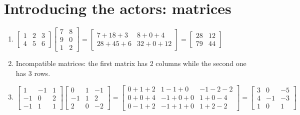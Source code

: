 \section*{Introducing the actors: matrices}

\begin{exercise}{2}
  \begin{enumerate}
    \item $\begin{bmatrix}1 & 2 & 3 \\ 4 & 5 & 6\end{bmatrix}
           \begin{bmatrix}7 & 8 \\ 9 & 0 \\ 1 & 2\end{bmatrix} =
           \begin{bmatrix}
              7 + 18 + 3 &  8 + 0 +  4 \\
             28 + 45 + 6 & 32 + 0 + 12
           \end{bmatrix} =
           \begin{bmatrix}28 & 12 \\ 79 & 44\end{bmatrix}$

    \item Incompatible matrices: the first matrix has 2 columns while the second
          one has 3 rows.

    \item $\begin{bmatrix}
              1 & -1 &  1 \\
             -1 &  0 &  2 \\
             -1 &  1 &  1
           \end{bmatrix}
           \begin{bmatrix}
              0 &  1 & -1 \\
             -1 &  1 &  2 \\
              2 &  0 & -2
           \end{bmatrix} =
           \begin{bmatrix}
             0 + 1 + 2 &  1 - 1 + 0 & -1 - 2 - 2 \\
             0 + 0 + 4 & -1 + 0 + 0 &  1 + 0 - 4 \\
             0 - 1 + 2 & -1 + 1 + 0 &  1 + 2 - 2
           \end{bmatrix} =
           \begin{bmatrix}
              3 &  0 & -5 \\
              4 & -1 & -3 \\
              1 &  0 &  1
           \end{bmatrix}$


\end{enumerate}
\end{exercise}
